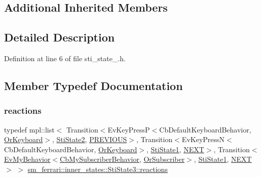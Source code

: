 \subsection*{Additional Inherited Members}


\subsection{Detailed Description}


Definition at line 6 of file sti\+\_\+state\+\_.\+h.



\subsection{Member Typedef Documentation}
\mbox{\label{structsm__ferrari_1_1inner__states_1_1StiState3_a7630ec646fb707c9df7922f94d4ad768}} 
\subsubsection{\texorpdfstring{reactions}{reactions}}
{\footnotesize\ttfamily typedef mpl\+::list$<$ Transition$<$Ev\+Key\+PressP$<$Cb\+Default\+Keyboard\+Behavior, \hyperlink{classsm__ferrari_1_1OrKeyboard}{Or\+Keyboard}$>$, \hyperlink{structsm__ferrari_1_1inner__states_1_1StiState2}{Sti\+State2}, \hyperlink{structsm__ferrari_1_1inner__states_1_1StiState3_1_1PREVIOUS}{P\+R\+E\+V\+I\+O\+US}$>$, Transition$<$Ev\+Key\+PressN$<$Cb\+Default\+Keyboard\+Behavior, \hyperlink{classsm__ferrari_1_1OrKeyboard}{Or\+Keyboard}$>$, \hyperlink{structsm__ferrari_1_1inner__states_1_1StiState1}{Sti\+State1}, \hyperlink{structsm__ferrari_1_1inner__states_1_1StiState3_1_1NEXT}{N\+E\+XT}$>$, Transition$<$\hyperlink{structsm__ferrari_1_1cl__subscriber_1_1EvMyBehavior}{Ev\+My\+Behavior}$<$\hyperlink{classsm__ferrari_1_1cl__subscriber_1_1CbMySubscriberBehavior}{Cb\+My\+Subscriber\+Behavior}, \hyperlink{classsm__ferrari_1_1OrSubscriber}{Or\+Subscriber}$>$, \hyperlink{structsm__ferrari_1_1inner__states_1_1StiState1}{Sti\+State1}, \hyperlink{structsm__ferrari_1_1inner__states_1_1StiState3_1_1NEXT}{N\+E\+XT}$>$ $>$ \hyperlink{structsm__ferrari_1_1inner__states_1_1StiState3_a7630ec646fb707c9df7922f94d4ad768}{sm\+\_\+ferrari\+::inner\+\_\+states\+::\+Sti\+State3\+::reactions}}



